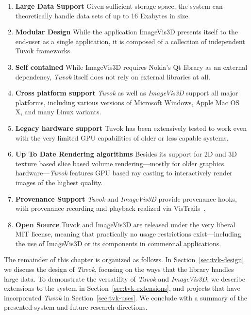 \begin{enumerate}

\item \textbf{Large Data Support}
Given sufficient storage space, the system can theoretically
handle data sets of up to 16 Exabytes in size.
\item \textbf{Modular Design}
While the application ImageVis3D presents itself to the
end-user as a single application, it is composed of a
collection of independent Tuvok frameworks.
\item \textbf{Self contained}
While ImageVis3D requires Nokia's Qt library
as an external dependency, \textit{Tuvok} itself does not rely on
external libraries at all.
\item \textbf{Cross platform support}
\textit{Tuvok} as well as \textit{ImageVis3D} support all major platforms,
including various versions of Microsoft Windows, Apple
Mac OS X, and many Linux variants.
\item \textbf{Legacy hardware support}
Tuvok has been extensively tested to work even with the
very limited GPU capabilities of older or less capable
systems.
\item \textbf{Up To Date Rendering algorithms}
Besides its support for 2D and 3D texture based slice
based volume rendering---mostly for older graphics
hardware---\textit{Tuvok} features GPU based ray casting to
interactively render images of the highest quality.
\item \textbf{Provenance Support}
\textit{Tuvok} and \textit{ImageVis3D} provide provenance hooks, with
provenance recording and playback realized via
VisTrails~\cite{Bavoil:2005:VisTrails}.
\item \textbf{Open Source}
Tuvok and ImageVis3D are released under the very liberal
MIT license, meaning that practically no usage
restrictions exist---including the use of ImageVis3D or its
components in commercial applications.

\end{enumerate}

The remainder of this chapter is organized as follows. In
Section~\ref{sec:tvk-design} we discuss the design of \textit{Tuvok},
focusing on the ways that the library handles large data. To
demonstrate
the versatility of \textit{Tuvok} and \textit{ImageVis3D}, we describe
extensions
to the system in Section~\ref{sec:tvk-extensions}, and projects that
have
incorporated \textit{Tuvok} in Section~\ref{sec:tvk-uses}. We conclude
with a summary of the presented system and future research directions.

